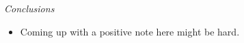 \documentclass[a4paper,11pt]{article}
\newcommand{\Rstar}{\ensuremath{R^*}}
\begin{document}

\textit{Conclusions}
\begin{itemize}
\item Coming up with a positive note here might be hard.
\end{itemize}
\end{document}
